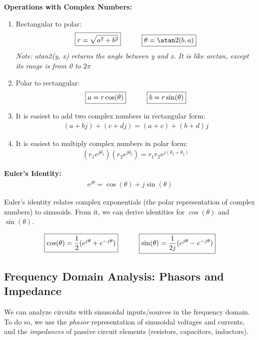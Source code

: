 \textbf{Operations with Complex Numbers:}
\begin{enumerate}
    \item Rectangular to polar:
    \begin{align*}
        \boxed{r = \sqrt{a^2 + b^2}} \hspace{30px} \boxed{\theta = \atan2(b, a)}
    \end{align*}
    \textit{Note: atan2(y, x) returns the angle between y and x. It is like arctan, except its range is from 0 to $2\pi$}
    \item Polar to rectangular:
    \begin{align*}
        \boxed{a = r \cos(\theta)} \hspace{30px} \boxed{b = r \sin(\theta)}
    \end{align*}

    \item It is easiest to add two complex numbers in rectangular form:
    \begin{align*}
        (a + bj) + (c + dj) = (a + c) + (b + d)j
    \end{align*}

    \item It is easiest to multiply complex numbers in polar form:
    \begin{align*}
        (r_1 e^{j \theta_1})(r_2 e^{j \theta_2}) = r_1 r_2 e^{j (\theta_1 + \theta_2)}
    \end{align*}
\end{enumerate}

\textbf{Euler's Identity:}
\begin{align*}
    \boxed{e^{j \theta} = \cos(\theta) + j \sin(\theta)}
\end{align*}

Euler's identity relates complex exponentials (the polar representation of complex numbers) to sinusoids. From it, we can derive identities for $\cos(\theta)$ and $\sin(\theta)$.

\begin{align*}
    \boxed{\cos(\theta) = \frac{1}{2} (e^{j \theta} + e^{-j \theta})} \hspace{30px}
    \boxed{\sin(\theta) = \frac{1}{2j} (e^{j \theta} - e^{-j \theta})}
\end{align*}

\newpage
\subsection*{Frequency Domain Analysis: Phasors and Impedance}
We can analyze circuits with sinusoidal inputs/sources in the frequency domain. To do so, we use the \textit{phasor} representation of sinusoidal voltages and currents, and the \textit{impedances} of passive circuit elements (resistors, capacitors, inductors).

